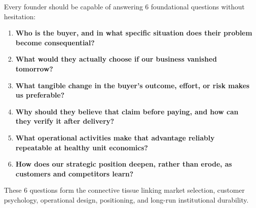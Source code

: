 Every founder should be capable of answering 6 foundational questions without hesitation:

\begin{enumerate}
    \item \textbf{Who is the buyer, and in what specific situation does their problem become consequential?}
    \item \textbf{What would they actually choose if our business vanished tomorrow?}
    \item \textbf{What tangible change in the buyer's outcome, effort, or risk makes us preferable?}
    \item \textbf{Why should they believe that claim before paying, and how can they verify it after delivery?}
    \item \textbf{What operational activities make that advantage reliably repeatable at healthy unit economics?}
    \item \textbf{How does our strategic position deepen, rather than erode, as customers and competitors learn?}
\end{enumerate}

These 6 questions form the connective tissue linking market selection, customer psychology, operational design, positioning, and long-run institutional durability.

